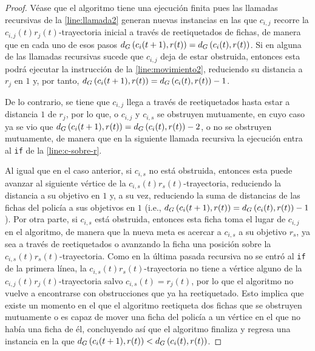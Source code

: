 \begin{proof}
    V\'ease que el algoritmo tiene una ejecuci\'on finita pues las llamadas
    recursivas de la \cref{line:llamada2} generan nuevas instancias en las que
    $c_{i,j}$ recorre la $c_{i,j}(t)r_j(t)$-trayectoria inicial a trav\'es de
    reetiquetados de fichas, de manera que en cada uno de esos pasos $d_G
    \left( c_i(t+1),r(t)\right) = d_G \left( c_i(t),r(t)\right)$. Si en alguna de las
    llamadas recursivas sucede que $c_{i,j}$ deja de estar obstruida, entonces
    esta podr\'a ejecutar la instrucci\'on de la \cref{line:movimiento2},
    reduciendo su distancia a $r_j$ en $1$ y, por tanto, $d_G
    \left( c_i(t+1),r(t)\right) = d_G \left( c_i(t),r(t)\right) - 1$.
    
    De lo contrario, se tiene que $c_{i,j}$ llega a trav\'es de reetiquetados
    hasta estar a distancia $1$ de $r_j$, por lo que, o $c_{i,j}$ y $c_{i,s}$ se
    obstruyen mutuamente, en cuyo caso ya se vio que $d_G \left( c_i(t+1),r(t)\right)
    = d_G \left( c_i(t),r(t)\right) - 2$, o no se obstruyen mutuamente, de manera que
    en la siguiente llamada recursiva la ejecuci\'on entra al \texttt{if} de la
    \cref{line:c-sobre-r}.
    
    Al igual que en el caso anterior, si $c_{i,s}$ no est\'a obstruida, entonces
    esta puede avanzar al siguiente v\'ertice de la
    $c_{i,s}(t)r_s(t)$-trayectoria, reduciendo la distancia a su objetivo en $1$
    y, a su vez, reduciendo la suma de distancias de las fichas del polic\'ia a
    sus objetivos en $1$ (i.e., $d_G \left( c_i(t+1),r(t)\right) = d_G
    \left( c_i(t),r(t)\right) - 1$). Por otra parte, si $c_{i,s}$ est\'a obstruida,
    entonces esta ficha toma el lugar de $c_{i,j}$ en el algoritmo, de manera
    que la nueva meta es acercar a $c_{i,s}$ a su objetivo $r_s$, ya sea a
    trav\'es de reetiquetados o avanzando la ficha una posici\'on sobre la
    $c_{i,s}(t)r_s(t)$-trayectoria. Como en la \'ultima pasada recursiva no se
    entr\'o al \texttt{if} de la primera l\'inea, la
    $c_{i,s}(t)r_s(t)$-trayectoria no tiene a v\'ertice alguno de la
    $c_{i,j}(t)r_{j}(t)$-trayectoria salvo $c_{i,s}(t)=r_j(t)$, por lo que el
    algoritmo no vuelve a encontrarse con obstrucciones que ya ha reetiquetado.
    Esto implica que existe un momento en el que el algoritmo reetiqueta dos
    fichas que se obstruyen mutuamente o es capaz de mover una ficha del
    polic\'ia a un v\'ertice en el que no hab\'ia una ficha de \'el, concluyendo
    as\'i que el algoritmo finaliza y regresa una instancia en la que $d_{G}
    \left( c_i(t+1),r(t)\right)< d_{G} \left( c_i(t),r(t)\right)$.

\end{proof}

